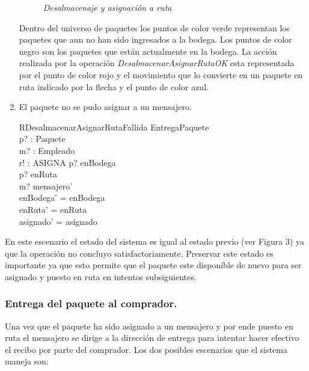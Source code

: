 \documentclass[12pt,a4paper,zed]{article}
\begin{document}
\begin{enumerate}
\begin{figure}[h]
\caption{\textit{Desalmacenaje y asignación a ruta}} \label{fig:M1}
\end{figure}
Dentro del universo de paquetes los puntos de color verde representan los paquetes que aun no han sido ingresados a la bodega. Los puntos de color negro son los paquetes que están actualmente en la bodega. La acción realizada por la operación \textit{DesalmacenarAsignarRutaOK} esta representada por el punto de color rojo y el movimiento que lo convierte en un paquete en ruta indicado por la flecha y el punto de color azul.

\item El paquete no se pudo asignar a un mensajero.

\begin{schema}{RDesalmacenarAsignarRutaFallida}
\Xi EntregaPaquete\\
p? : Paquete\\
m? : Empleado\\
r! : ASIGNA
\where
p? \in enBodega\\
p? \notin  enRuta\\
m? \in mensajero'\\
enBodega' = enBodega\\
enRuta' = enRuta\\
asignado' = asignado
\end{schema}
\end{enumerate}

En este escenario el estado del sistema es igual al estado previo (ver Figura 3) ya que la operación no concluyo satisfactoriamente. Preservar este estado es importante ya que esto permite que el paquete este disponible de nuevo para ser asignado y puesto en ruta en intentos subsiguientes.

\subsubsection{Entrega del paquete al comprador.}
Una vez que el paquete ha sido asignado a un mensajero y por ende puesto en ruta el mensajero se dirige a la dirección de entrega para intentar hacer efectivo el recibo por parte del comprador. Los dos posibles escenarios que el sistema maneja son:
\end{document}

